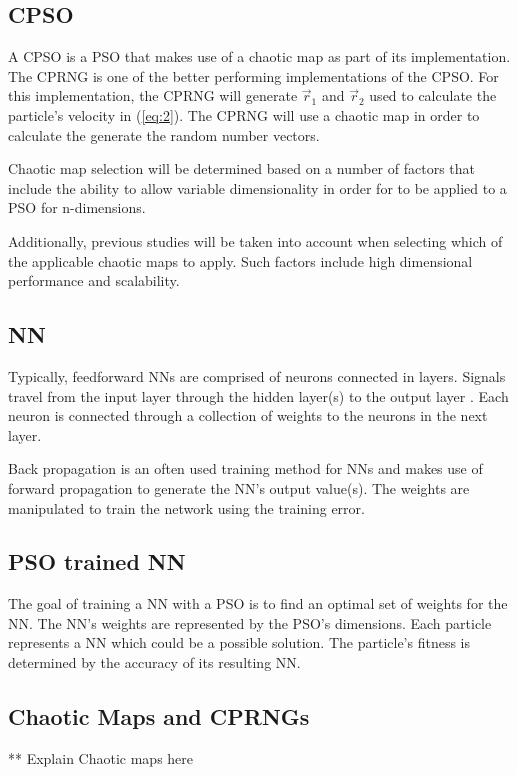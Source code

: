 \documentclass[conference]{IEEEtran}
\begin{document}
	\subsection{CPSO}
	A \ac{CPSO} is a \ac{PSO} that makes use of a chaotic map as part of its implementation. The \ac{CPRNG} is one of the better performing implementations of the \ac{CPSO}. For this implementation, the \ac{CPRNG} will generate $ \vec{r}_{1} $ and $ \vec{r}_{2} $ used to calculate the particle's velocity in (\ref{eq:2}). The \ac{CPRNG} will use a chaotic map in order to calculate the generate the random number vectors.

	Chaotic map selection will be determined based on a number of factors that include the ability to allow variable dimensionality in order for to be applied to a \ac{PSO} for n-dimensions.

	Additionally, previous studies will be taken into account when selecting which of the applicable chaotic maps to apply. Such factors include high dimensional performance and scalability.

	\subsection{\ac{NN}}
	Typically, feedforward \ac{NN}s are comprised of neurons connected in layers. Signals travel from the input layer through the hidden layer(s) to the output layer \cite{anna:meas-sat-nn}. Each neuron is connected through a collection of weights to the neurons in the next layer.

	Back propagation is an often used training method for \ac{NN}s and makes use of forward propagation to generate the \ac{NN}'s output value(s). The weights are manipulated to train the network using the training error.

	\subsection{PSO trained NN}
	The goal of training a \ac{NN} with a \ac{PSO} is to find an optimal set of weights for the \ac{NN}. The \ac{NN}’s weights are represented by the \ac{PSO}'s dimensions. Each particle represents a \ac{NN} which could be a possible solution. The particle's fitness is determined by the accuracy of its resulting \ac{NN}.

	\subsection{Chaotic Maps and \ac{CPRNG}s}
	** Explain Chaotic maps here
\end{document}
